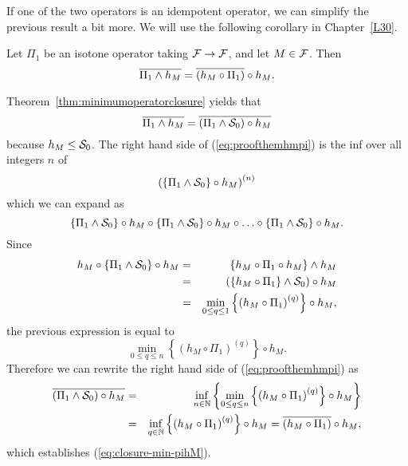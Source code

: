 If one of the two operators is an idempotent operator, we can simplify the previous result a bit more.
We will use the following corollary in Chapter~\ref{L30}.

\begin{corollary}
Let $\Pi_1$ be an isotone operator taking $\mathcal F \rightarrow \mathcal F$, and let $M \in \mathcal F$. Then
\begin{equation}
\mylabel{eq:closure-min-pihM}
  \overline{\Pi_1 \wedge h_M}= \overline{(h_M \circ \Pi_1)} \circ h_M.
\end{equation}
\end{corollary}

\pr Theorem~\ref{thm:minimumoperatorclosure} yields that
\begin{equation}
\mylabel{eq:proofthemhmpi}
\overline{\Pi_1 \wedge h_M} = \overline{(\Pi_1 \wedge \calS_0) \circ h_M}
\end{equation}
because $h_M \leq \mathcal S_0$. The right hand side of (\ref{eq:proofthemhmpi}) is the inf over all integers $n$ of
$$ \left( \{ \Pi_1 \wedge \mathcal S_0 \} \circ h_{M} \right)^{(n)} $$
which we can expand as
$$ \{ \Pi_1 \wedge \mathcal S_0 \} \circ h_{M} \circ  \{ \Pi_1 \wedge \mathcal S_0 \} \circ h_{M} \circ \ldots \circ  \{ \Pi_1 \wedge \mathcal S_0 \} \circ h_{M}. $$
Since
\begin{eqnarray*}
h_{M} \circ  \{ \Pi_1 \wedge \mathcal S_0 \} \circ h_{M} & = & \left\{ h_{M} \circ  \Pi_1 \circ h_{M} \right\} \wedge  h_M \\
& = &  \left( \{ h_{M} \circ  \Pi_1 \} \wedge \mathcal S_0 \right)  \circ h_{M}  \\
& = & \min_{0 \leq q \leq 1} \left\{ \left(  h_{M} \circ \Pi_1  \right)^{(q)} \right\} \circ h_{M},
\end{eqnarray*}
the previous expression is equal to
$$ \min_{0 \leq q \leq n} \left\{ \left(  h_{M} \circ  \Pi_1 \right)^{(q)} \right\} \circ h_{M}. $$
Therefore we can rewrite the right hand side of
(\ref{eq:proofthemhmpi}) as
\begin{eqnarray*}
\overline{(\Pi_1 \wedge \mathcal S_0) \circ h_M} & = & \inf_{n \in
\mathbb{N}} \left\{\min_{0 \leq q \leq n} \left\{ \left(  h_{M} \circ
\Pi_1  \right)^{(q)} \right\}  \circ h_{M} \right\} \\ & = &
\inf_{q \in \mathbb{N}} \left\{ \left(  h_{M} \circ \Pi_1 \right)^{(q)}
\right\}  \circ h_{M} = \overline{ ( h_{M} \circ \Pi_1  ) }  \circ
h_{M},
\end{eqnarray*}
which establishes (\ref{eq:closure-min-pihM}).



